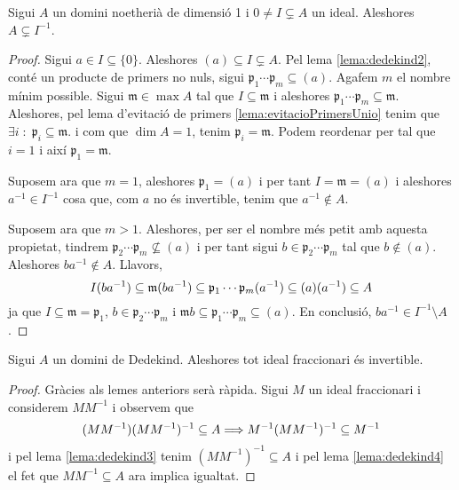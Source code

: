 \documentclass[../../../main.tex]{subfiles}
\begin{document}
\begin{lema}
\label{lema:dedekind4} Sigui $A$ un domini noetherià de dimensió 1 i $0\not=I\varsubsetneq A$ un ideal. Aleshores $A\varsubsetneq I^{-1}$.
\end{lema}
\begin{proof}
Sigui $a\in I\subseteq \{0\}$. Aleshores $(a)\subseteq I\varsubsetneq A$. Pel lema \ref{lema:dedekind2}, conté un producte de primers no nuls, sigui $\mathfrak{p_1}\cdots\mathfrak{p}_m\subseteq (a)$. Agafem $m$ el nombre mínim possible. Sigui $\mathfrak{m}\in \max A$ tal que $I\subseteq\mathfrak{m}$ i aleshores $\mathfrak{p}_1\cdots\mathfrak{p}_m\subseteq \mathfrak{m}$. Aleshores, pel lema d'evitació de primers \ref{lema:evitacioPrimersUnio} tenim que $\exists i\;:\;\mathfrak{p}_i\subseteq\mathfrak{m}$. i com que $\dim A = 1$, tenim $\mathfrak{p}_i = \mathfrak{m}$. Podem reordenar per tal que $i = 1$ i així $\mathfrak{p}_1 = \mathfrak{m}$.

Suposem ara que $m = 1$, aleshores $\mathfrak{p}_1 = (a)$ i per tant $I = \mathfrak{m} = (a)$ i aleshores $a^{-1}\in I^{-1}$ cosa que, com $a$ no és invertible, tenim que $a^{-1}\not\in A$.

Suposem ara que $m>1$. Aleshores, per ser el nombre més petit amb aquesta propietat, tindrem $\mathfrak{p}_2\cdots\mathfrak{p}_m\not\subseteq (a)$ i per tant sigui $b\in\mathfrak{p}_2\cdots\mathfrak{p}_m$ tal que $b\not\in (a)$. Aleshores $ba^{-1}\not\in A$. Llavors,
\begin{equation}
    \notag
    I(ba^{-1}) \subseteq\mathfrak{m}(ba^{-1})\subseteq\mathfrak{p}_1\cdots\mathfrak{p}_m(a^{-1})\subseteq (a)(a^{-1})\subseteq A
\end{equation}
ja que $I\subseteq\mathfrak{m} = \mathfrak{p}_1$, $b\in\mathfrak{p}_2\cdots\mathfrak{p}_m$ i $\mathfrak{m}b\subseteq \mathfrak{p}_1\cdots\mathfrak{p}_m\subseteq (a)$. En conclusió, $ba^{-1}\in I^{-1}\setminus A$.
\end{proof}

\begin{ter}
\label{ter:dedekind} Sigui $A$ un domini de Dedekind. Aleshores tot ideal fraccionari és invertible.
\end{ter}
\begin{proof}
Gràcies als lemes anteriors serà ràpida. Sigui $M$ un ideal fraccionari i considerem $MM^{-1}$ i observem que
\begin{equation}
    \notag
    (MM^{-1})(MM^{-1})^{-1}\subseteq A \Longrightarrow M^{-1}(MM^{-1})^{-1}\subseteq M^{-1}
\end{equation}
i pel lema \ref{lema:dedekind3} tenim $(MM^{-1})^{-1}\subseteq A$ i pel lema \ref{lema:dedekind4} el fet que $MM^{-1}\subseteq A$ ara implica igualtat.
\end{proof}
\end{document}
